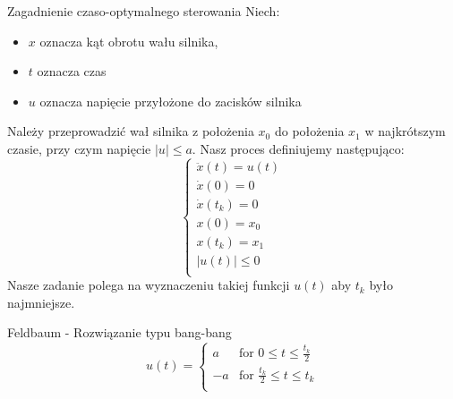 \begin{example}{Zagadnienie czaso-optymalnego sterowania}{}{}
    Niech: \begin{itemize}
        \item $x$ oznacza kąt obrotu wału silnika, 
        \item $t$ oznacza czas
        \item $u$ oznacza napięcie przyłożone do zacisków silnika
    \end{itemize}
    Należy przeprowadzić wał silnika z położenia $x_0$ do położenia $x_1$ w najkrótszym czasie, przy czym napięcie $|u| \leq a$.
    Nasz proces definiujemy następująco:
    $$
    \begin{cases}
        \ddot{x}(t) = u(t) \\
        \dot{x}(0) = 0 \\
        \dot{x}(t_k) = 0 \\
        x(0) = x_0 \\
        x(t_k) = x_1 \\
        |u(t)| \leq 0 \\
    \end{cases}
    $$
    Nasze zadanie polega na wyznaczeniu takiej funkcji $u(t)$ aby $t_k$ było najmniejsze.

    \begin{solution}{Feldbaum - Rozwiązanie typu bang-bang}{}{}
        $$u(t) = \begin{cases}
            a & \text{for } 0 \leq t \leq \frac{t_k}{2} \\
            -a & \text{for } \frac{t_k}{2} \leq t \leq t_k \\
        \end{cases}$$
    \end{solution}
\end{example}

